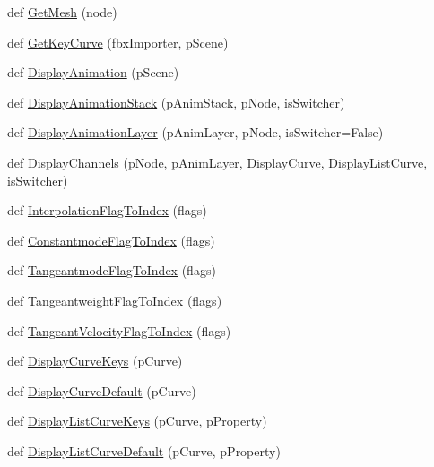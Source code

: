 \begin{DoxyCompactItemize}
\item 
def \hyperlink{namespace_display_animation2_af90fa6df8670945b767c85263809452e}{Get\+Mesh} (node)
\item 
def \hyperlink{namespace_display_animation2_a9b0d487a1b97cacb8e7a2d0ddda16b67}{Get\+Key\+Curve} (fbx\+Importer, p\+Scene)
\item 
def \hyperlink{namespace_display_animation2_a040eda58238b1f63cd4229891c8b8753}{Display\+Animation} (p\+Scene)
\item 
def \hyperlink{namespace_display_animation2_ad815732d177f54a16c36204ce2999fdd}{Display\+Animation\+Stack} (p\+Anim\+Stack, p\+Node, is\+Switcher)
\item 
def \hyperlink{namespace_display_animation2_a87bcefe9ae4144d32e93a4fa58ee269d}{Display\+Animation\+Layer} (p\+Anim\+Layer, p\+Node, is\+Switcher=False)
\item 
def \hyperlink{namespace_display_animation2_a5d4a4f3638af7347010f27ba9d6a5320}{Display\+Channels} (p\+Node, p\+Anim\+Layer, Display\+Curve, Display\+List\+Curve, is\+Switcher)
\item 
def \hyperlink{namespace_display_animation2_a93bd82b9e11c12830038557dfb7f232a}{Interpolation\+Flag\+To\+Index} (flags)
\item 
def \hyperlink{namespace_display_animation2_ae17888b9827b3e583195faf1af763af4}{Constantmode\+Flag\+To\+Index} (flags)
\item 
def \hyperlink{namespace_display_animation2_a37089913f9abb55200dcbff52059ab26}{Tangeantmode\+Flag\+To\+Index} (flags)
\item 
def \hyperlink{namespace_display_animation2_aa6ac6755f9ef55f5dde8821c69ec8d88}{Tangeantweight\+Flag\+To\+Index} (flags)
\item 
def \hyperlink{namespace_display_animation2_a40d67e851decf22965f2354a27893a86}{Tangeant\+Velocity\+Flag\+To\+Index} (flags)
\item 
def \hyperlink{namespace_display_animation2_adf26705323a0b889c2791aa1922f0e66}{Display\+Curve\+Keys} (p\+Curve)
\item 
def \hyperlink{namespace_display_animation2_a4897bf2cf40d8070d751102ba879fa26}{Display\+Curve\+Default} (p\+Curve)
\item 
def \hyperlink{namespace_display_animation2_a38310b0643fc52b221cbd0e777206272}{Display\+List\+Curve\+Keys} (p\+Curve, p\+Property)
\item 
def \hyperlink{namespace_display_animation2_a8872e4876a507066d82b9c86e4677107}{Display\+List\+Curve\+Default} (p\+Curve, p\+Property)
\end{DoxyCompactItemize}
